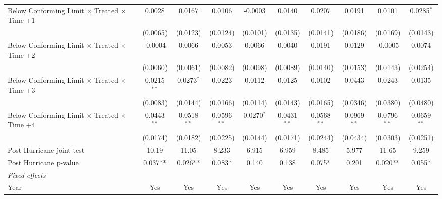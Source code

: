 \begin{tabular}{lccccccccc}
   Below Conforming Limit $\times$ Treated $\times$ Time +1   & 0.0028        & 0.0167        & 0.0106        & -0.0003      & 0.0140        & 0.0207        & 0.0191        & 0.0101        & 0.0285$^{*}$\\   
                                                              & (0.0065)      & (0.0123)      & (0.0124)      & (0.0101)     & (0.0135)      & (0.0141)      & (0.0186)      & (0.0169)      & (0.0143)\\   
   Below Conforming Limit $\times$ Treated $\times$ Time +2   & -0.0004       & 0.0066        & 0.0053        & 0.0066       & 0.0040        & 0.0191        & 0.0129        & -0.0005       & 0.0074\\   
                                                              & (0.0060)      & (0.0061)      & (0.0082)      & (0.0098)     & (0.0089)      & (0.0140)      & (0.0153)      & (0.0143)      & (0.0254)\\   
   Below Conforming Limit $\times$ Treated $\times$ Time +3   & 0.0215$^{**}$ & 0.0273$^{*}$  & 0.0223        & 0.0112       & 0.0125        & 0.0102        & 0.0443        & 0.0243        & 0.0135\\   
                                                              & (0.0083)      & (0.0144)      & (0.0166)      & (0.0114)     & (0.0143)      & (0.0165)      & (0.0346)      & (0.0380)      & (0.0480)\\   
   Below Conforming Limit $\times$ Treated $\times$ Time +4   & 0.0443$^{**}$ & 0.0518$^{**}$ & 0.0596$^{**}$ & 0.0270$^{*}$ & 0.0431$^{**}$ & 0.0568$^{**}$ & 0.0969$^{**}$ & 0.0796$^{**}$ & 0.0659$^{**}$\\   
                                                              & (0.0174)      & (0.0182)      & (0.0225)      & (0.0144)     & (0.0171)      & (0.0244)      & (0.0434)      & (0.0303)      & (0.0251)\\   
   Post Hurricane joint test                                  & 10.19         & 11.05         & 8.233         & 6.915        & 6.959         & 8.485         & 5.977         & 11.65         & 9.259\\  
   Post Hurricane p-value                                     & 0.037**       & 0.026**       & 0.083*        & 0.140        & 0.138         & 0.075*        & 0.201         & 0.020**       & 0.055*\\  
   \midrule
   \emph{Fixed-effects}\\
   Year                                                       & Yes           & Yes           & Yes           & Yes          & Yes           & Yes           & Yes           & Yes           & Yes\\  

\end{tabular}
